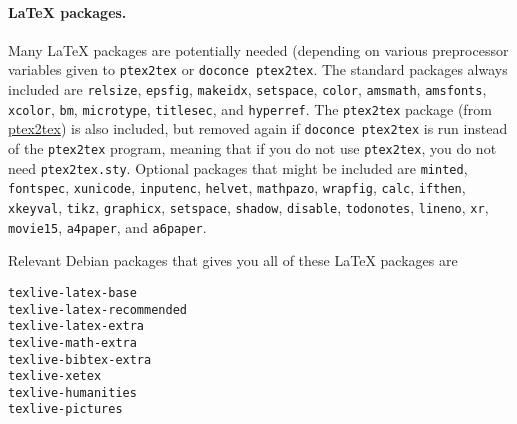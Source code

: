 \documentclass[%
oneside,                 %
final,                   %
10pt]{article}
\begin{document}
\paragraph{{\LaTeX} packages.}
Many {\LaTeX} packages are potentially needed (depending on various
preprocessor variables given to {\fontsize{10pt}{10pt}\Verb!ptex2tex!} or {\fontsize{10pt}{10pt}\Verb!doconce ptex2tex!}.  The
standard packages always included are {\fontsize{10pt}{10pt}\Verb!relsize!}, {\fontsize{10pt}{10pt}\Verb!epsfig!}, {\fontsize{10pt}{10pt}\Verb!makeidx!},
{\fontsize{10pt}{10pt}\Verb!setspace!}, {\fontsize{10pt}{10pt}\Verb!color!}, {\fontsize{10pt}{10pt}\Verb!amsmath!}, {\fontsize{10pt}{10pt}\Verb!amsfonts!}, {\fontsize{10pt}{10pt}\Verb!xcolor!}, {\fontsize{10pt}{10pt}\Verb!bm!},
{\fontsize{10pt}{10pt}\Verb!microtype!}, {\fontsize{10pt}{10pt}\Verb!titlesec!}, and {\fontsize{10pt}{10pt}\Verb!hyperref!}.  The {\fontsize{10pt}{10pt}\Verb!ptex2tex!} package (from
\href{{http://code.google.com/p/ptex2tex}}{ptex2tex}) is also included, but
removed again if {\fontsize{10pt}{10pt}\Verb!doconce ptex2tex!} is run instead of the {\fontsize{10pt}{10pt}\Verb!ptex2tex!}
program, meaning that if you do not use {\fontsize{10pt}{10pt}\Verb!ptex2tex!}, you do not need
{\fontsize{10pt}{10pt}\Verb!ptex2tex.sty!}. Optional packages that might be included are {\fontsize{10pt}{10pt}\Verb!minted!},
{\fontsize{10pt}{10pt}\Verb!fontspec!}, {\fontsize{10pt}{10pt}\Verb!xunicode!}, {\fontsize{10pt}{10pt}\Verb!inputenc!}, {\fontsize{10pt}{10pt}\Verb!helvet!}, {\fontsize{10pt}{10pt}\Verb!mathpazo!}, {\fontsize{10pt}{10pt}\Verb!wrapfig!},
{\fontsize{10pt}{10pt}\Verb!calc!}, {\fontsize{10pt}{10pt}\Verb!ifthen!}, {\fontsize{10pt}{10pt}\Verb!xkeyval!}, {\fontsize{10pt}{10pt}\Verb!tikz!}, {\fontsize{10pt}{10pt}\Verb!graphicx!}, {\fontsize{10pt}{10pt}\Verb!setspace!}, {\fontsize{10pt}{10pt}\Verb!shadow!},
{\fontsize{10pt}{10pt}\Verb!disable!}, {\fontsize{10pt}{10pt}\Verb!todonotes!}, {\fontsize{10pt}{10pt}\Verb!lineno!}, {\fontsize{10pt}{10pt}\Verb!xr!}, {\fontsize{10pt}{10pt}\Verb!movie15!}, {\fontsize{10pt}{10pt}\Verb!a4paper!}, and
{\fontsize{10pt}{10pt}\Verb!a6paper!}.

Relevant Debian packages that gives you all of these {\LaTeX} packages are

\begin{Verbatim}[fontsize=\fontsize{9pt}{9pt},tabsize=8,baselinestretch=0.85,
fontfamily=tt,xleftmargin=7mm]
texlive-latex-base
texlive-latex-recommended
texlive-latex-extra
texlive-math-extra
texlive-bibtex-extra
texlive-xetex
texlive-humanities
texlive-pictures
\end{Verbatim}
\noindent
\end{document}
